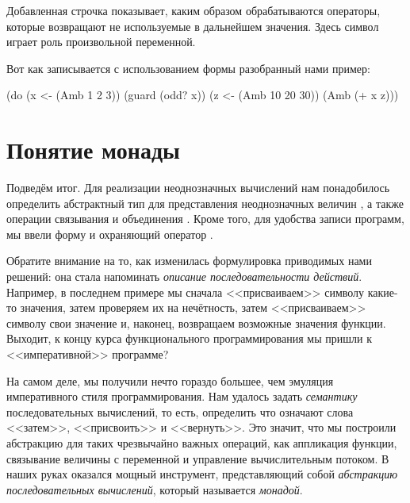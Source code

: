 Добавленная строчка показывает, каким образом обрабатываются операторы, которые возвращают не используемые в дальнейшем значения. Здесь символ \s{_} играет роль произвольной переменной.

Вот как записывается с использованием формы  разобранный нами пример:

\begin{SchemeCode}
(do (x <- (Amb 1 2 3))
    (guard (odd? x))
    (z <- (Amb 10 20 30))
    (Amb (+ x z)))
\end{SchemeCode}


\section[2]{Понятие монады}%
Подведём итог. Для реализации неоднозначных вычислений нам понадобилось определить абстрактный тип для представления неоднозначных величин , а также операции связывания  и объединения . Кроме того, для удобства записи программ, мы ввели форму  и охраняющий оператор .

Обратите внимание на то, как изменилась формулировка приводимых нами решений: она стала напоминать \emph{описание последовательности действий}. 
Например, в последнем примере мы сначала <<присваиваем>> символу  какие-то значения, затем проверяем их на нечётность, затем <<присваиваем>> символу  свои значение и, наконец, возвращаем возможные значения функции. Выходит, к концу курса функционального программирования мы  пришли к <<императивной>> программе? 

На самом деле, мы получили нечто гораздо большее, чем эмуляция императивного стиля программирования. Нам удалось задать \emph{семантику} последовательных вычислений, то есть, определить что означают слова <<затем>>, <<присвоить>> и <<вернуть>>. Это значит, что мы построили абстракцию для таких чрезвычайно важных операций, как  аппликация функции, связывание величины с переменной и управление вычислительным потоком. В наших руках оказался мощный инструмент, представляющий собой \emph{абстракцию последовательных вычислений}, который называется \emph{монадой}. 

